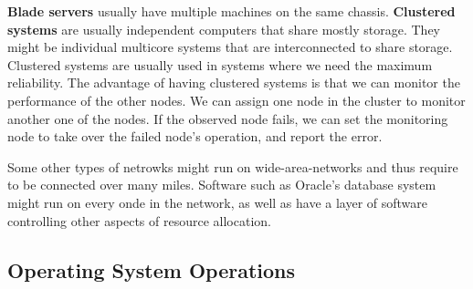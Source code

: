 \documentclass{tufte-handout}
\begin{document}
\textbf{Blade servers} usually have multiple machines on the same chassis. 
\textbf{Clustered systems} are usually independent computers that share mostly storage.
They might be individual multicore systems that are interconnected to share storage.
Clustered systems are usually used in systems where we need the maximum reliability.
The advantage of having clustered systems is that we can monitor the performance of the
other nodes. We can assign one node in the cluster to monitor another one of the nodes.
If the observed node fails, we can set the monitoring node to take over the failed node's
operation, and report the error.

Some other types of netrowks might run on wide-area-networks and thus require to be 
connected over many miles. Software such as Oracle's database system might run on every 
onde in the network, as well as have a layer of software controlling other aspects of
resource allocation.

\subsection{Operating System Operations}
\end{document}
